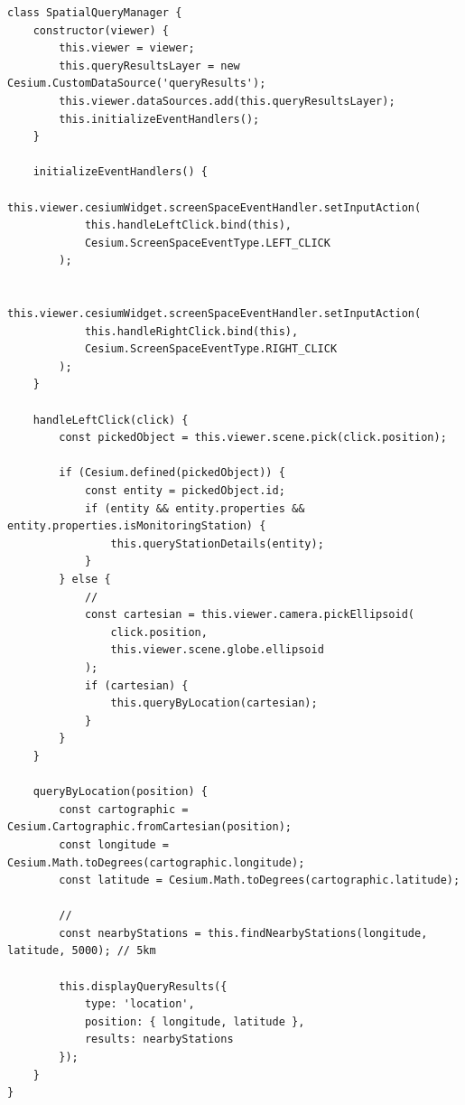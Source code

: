 \begin{lstlisting}[style=javascript]
class SpatialQueryManager {
    constructor(viewer) {
        this.viewer = viewer;
        this.queryResultsLayer = new Cesium.CustomDataSource('queryResults');
        this.viewer.dataSources.add(this.queryResultsLayer);
        this.initializeEventHandlers();
    }
    
    initializeEventHandlers() {
        this.viewer.cesiumWidget.screenSpaceEventHandler.setInputAction(
            this.handleLeftClick.bind(this),
            Cesium.ScreenSpaceEventType.LEFT_CLICK
        );
        
        this.viewer.cesiumWidget.screenSpaceEventHandler.setInputAction(
            this.handleRightClick.bind(this),
            Cesium.ScreenSpaceEventType.RIGHT_CLICK
        );
    }
    
    handleLeftClick(click) {
        const pickedObject = this.viewer.scene.pick(click.position);
        
        if (Cesium.defined(pickedObject)) {
            const entity = pickedObject.id;
            if (entity && entity.properties && entity.properties.isMonitoringStation) {
                this.queryStationDetails(entity);
            }
        } else {
            // 
            const cartesian = this.viewer.camera.pickEllipsoid(
                click.position, 
                this.viewer.scene.globe.ellipsoid
            );
            if (cartesian) {
                this.queryByLocation(cartesian);
            }
        }
    }
    
    queryByLocation(position) {
        const cartographic = Cesium.Cartographic.fromCartesian(position);
        const longitude = Cesium.Math.toDegrees(cartographic.longitude);
        const latitude = Cesium.Math.toDegrees(cartographic.latitude);
        
        // 
        const nearbyStations = this.findNearbyStations(longitude, latitude, 5000); // 5km
        
        this.displayQueryResults({
            type: 'location',
            position: { longitude, latitude },
            results: nearbyStations
        });
    }
}
\end{lstlisting}

\hypertarget{section-167}{%
\paragraph{}\label{section-167}}

